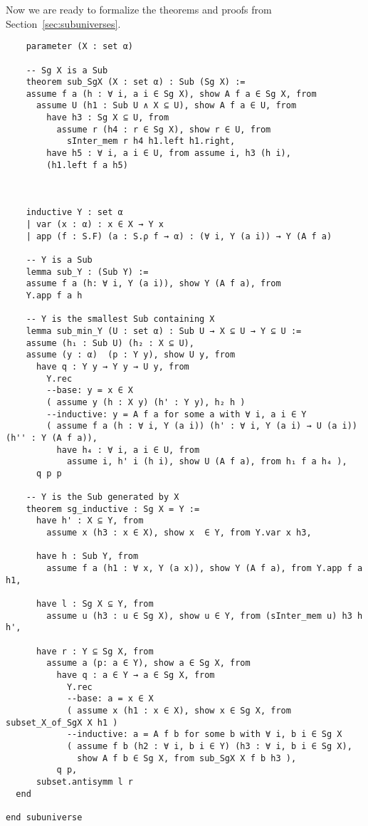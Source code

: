 \documentclass[12pt]{amsart}  %
\begin{document}
Now we are ready to formalize the theorems and proofs from Section~\ref{sec:subuniverses}.

\begin{lstlisting}  
    parameter (X : set α)
  
    -- Sg X is a Sub
    theorem sub_SgX (X : set α) : Sub (Sg X) := 
    assume f a (h : ∀ i, a i ∈ Sg X), show A f a ∈ Sg X, from 
      assume U (h1 : Sub U ∧ X ⊆ U), show A f a ∈ U, from 
        have h3 : Sg X ⊆ U, from 
          assume r (h4 : r ∈ Sg X), show r ∈ U, from 
            sInter_mem r h4 h1.left h1.right,
        have h5 : ∀ i, a i ∈ U, from assume i, h3 (h i),
        (h1.left f a h5)
    

  
    inductive Y : set α
    | var (x : α) : x ∈ X → Y x
    | app (f : S.F) (a : S.ρ f → α) : (∀ i, Y (a i)) → Y (A f a)
  
    -- Y is a Sub
    lemma sub_Y : (Sub Y) := 
    assume f a (h: ∀ i, Y (a i)), show Y (A f a), from 
    Y.app f a h 
  
    -- Y is the smallest Sub containing X
    lemma sub_min_Y (U : set α) : Sub U → X ⊆ U → Y ⊆ U :=
    assume (h₁ : Sub U) (h₂ : X ⊆ U),
    assume (y : α)  (p : Y y), show U y, from 
      have q : Y y → Y y → U y, from 
        Y.rec
        --base: y = x ∈ X
        ( assume y (h : X y) (h' : Y y), h₂ h )
        --inductive: y = A f a for some a with ∀ i, a i ∈ Y
        ( assume f a (h : ∀ i, Y (a i)) (h' : ∀ i, Y (a i) → U (a i)) (h'' : Y (A f a)),
          have h₄ : ∀ i, a i ∈ U, from 
            assume i, h' i (h i), show U (A f a), from h₁ f a h₄ ),
      q p p
  
    -- Y is the Sub generated by X
    theorem sg_inductive : Sg X = Y :=
      have h' : X ⊆ Y, from 
        assume x (h3 : x ∈ X), show x  ∈ Y, from Y.var x h3,

      have h : Sub Y, from 
        assume f a (h1 : ∀ x, Y (a x)), show Y (A f a), from Y.app f a h1,

      have l : Sg X ⊆ Y, from 
        assume u (h3 : u ∈ Sg X), show u ∈ Y, from (sInter_mem u) h3 h h',
  
      have r : Y ⊆ Sg X, from
        assume a (p: a ∈ Y), show a ∈ Sg X, from
          have q : a ∈ Y → a ∈ Sg X, from 
            Y.rec 
            --base: a = x ∈ X
            ( assume x (h1 : x ∈ X), show x ∈ Sg X, from subset_X_of_SgX X h1 )
            --inductive: a = A f b for some b with ∀ i, b i ∈ Sg X
            ( assume f b (h2 : ∀ i, b i ∈ Y) (h3 : ∀ i, b i ∈ Sg X),
              show A f b ∈ Sg X, from sub_SgX X f b h3 ),
          q p,
      subset.antisymm l r
  end
  
end subuniverse
\end{lstlisting}  
\end{document}
